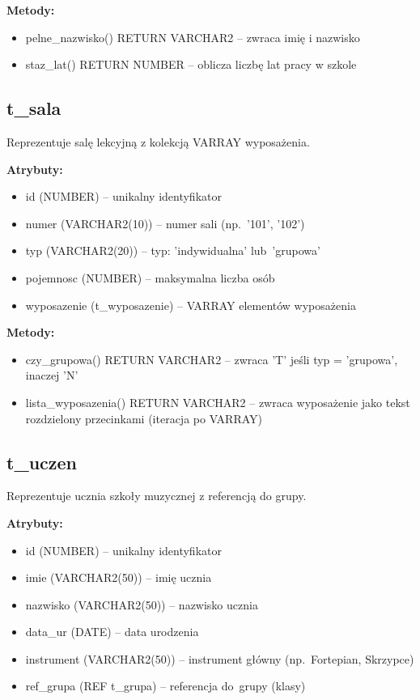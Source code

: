 \documentclass[12pt,a4paper]{article}
\begin{document}
\textbf{Metody:}
\begin{itemize}[nosep]
    \item pelne\_nazwisko() RETURN VARCHAR2 -- zwraca imię i nazwisko
    \item staz\_lat() RETURN NUMBER -- oblicza liczbę lat pracy w szkole
\end{itemize}

\subsection{t\_sala}

Reprezentuje salę lekcyjną z kolekcją VARRAY wyposażenia.

\textbf{Atrybuty:}
\begin{itemize}[nosep]
    \item id (NUMBER) -- unikalny identyfikator
    \item numer (VARCHAR2(10)) -- numer sali (np.~'101', '102')
    \item typ (VARCHAR2(20)) -- typ: 'indywidualna' lub~'grupowa'
    \item pojemnosc (NUMBER) -- maksymalna liczba osób
    \item wyposazenie (t\_wyposazenie) -- VARRAY elementów wyposażenia
\end{itemize}

\textbf{Metody:}
\begin{itemize}[nosep]
    \item czy\_grupowa() RETURN VARCHAR2 -- zwraca 'T' jeśli typ = 'grupowa', inaczej 'N'
    \item lista\_wyposazenia() RETURN VARCHAR2 -- zwraca wyposażenie jako tekst rozdzielony przecinkami (iteracja po VARRAY)
\end{itemize}

\subsection{t\_uczen}

Reprezentuje ucznia szkoły muzycznej z referencją do grupy.

\textbf{Atrybuty:}
\begin{itemize}[nosep]
    \item id (NUMBER) -- unikalny identyfikator
    \item imie (VARCHAR2(50)) -- imię ucznia
    \item nazwisko (VARCHAR2(50)) -- nazwisko ucznia
    \item data\_ur (DATE) -- data urodzenia
    \item instrument (VARCHAR2(50)) -- instrument główny (np.~Fortepian, Skrzypce)
    \item ref\_grupa (REF t\_grupa) -- referencja do~grupy (klasy)
\end{itemize}
\end{document}
